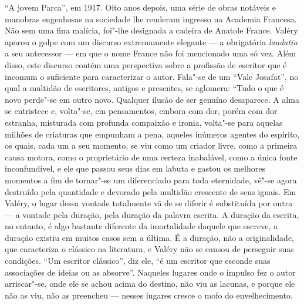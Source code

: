 ``A jovem Parca'', em 1917. Oito anos depois, uma série de obras notáveis
​​e manobras engenhosas na sociedade lhe renderam ingresso na Academia
Francesa. Não sem uma fina malícia, foi"-lhe designada a cadeira de
Anatole France. Valéry aparou o golpe com um discurso extremamente
elegante --- a obrigatória \emph{laudatio} a seu antecessor --- em que o
nome France não foi mencionado uma só vez. Além disso, este discurso
contém uma perspectiva sobre a profissão de escritor que é incomum o
suficiente para caracterizar o autor. Fala"-se de um ``Vale Josafat'', no
qual a multidão de escritores, antigos e presentes, se aglomera: ``Tudo o
que é novo perde"-se em outro novo. Qualquer ilusão de ser genuíno
desaparece. A alma se entristece e, volta"-se, em pensamentos, embora com
dor, porém com dor estranha, misturada com profunda compaixão e ironia,
volta"-se para aquelas milhões de criaturas que empunham a pena, aqueles
inúmeros agentes do espírito, os quais, cada um a seu momento, se viu
como um criador livre, como a primeira causa motora, como o proprietário
de uma certeza inabalável, como a única fonte inconfundível, e ele que
passou seus dias em labuta e gastou os melhores momentos a fim de
tornar"-se um diferenciado para toda eternidade, vê"-se agora destruído
pela quantidade e devorado pela multidão crescente de seus iguais. Em
Valéry, o lugar dessa vontade totalmente vã de se diferir é substituída
por outra --- a vontade pela duração, pela duração da palavra escrita. A
duração da escrita, no entanto, é algo bastante diferente da
imortalidade daquele que escreve, a duração existiu em muitos casos sem
a última. É a duração, não a originalidade, que caracteriza o clássico
na literatura, e Valéry não se cansou de perseguir suas condições. ``Um
escritor clássico'', diz ele, ``é um escritor que esconde suas associações
de ideias ou as absorve''. Naqueles lugares onde o impulso fez o autor
arriscar"-se, onde ele se achou acima do destino, não viu as lacunas, e
porque ele não as viu, não as preencheu --- nesses lugares cresce o mofo
do envelhecimento.

